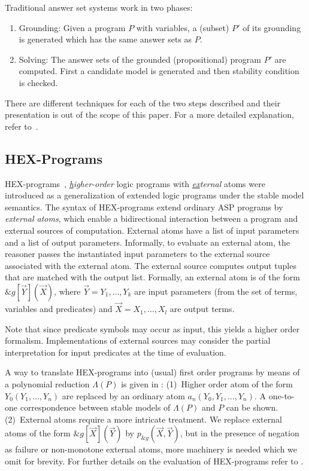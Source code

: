 Traditional answer set systems work in two phases:
\begin{enumerate}
\item Grounding: Given a program \(P\) with variables, a (subset) \(P'\) of its grounding is generated which has the same answer sets as \(P\).
\item Solving: The answer sets of the grounded (propositional) program \(P'\) are computed. First a candidate model is generated and then stability condition is checked.
\end{enumerate}


There are different techniques for each of the two steps described and their presentation is out of the scope of this paper. For a more detailed explanation, refer to~\cite{}.

\subsection{HEX-Programs}
HEX-programs~\cite{hex}, \emph{\underline{h}igher-order} logic programs with \emph{\underline{ex}ternal} atoms were introduced as a generalization of extended logic programs under the stable model semantics. The syntax of HEX-programs extend ordinary ASP programs by \emph{external atoms}, which enable a bidirectional interaction between a program and external sources of computation. External atoms have a list of input parameters and a list of output parameters. Informally, to evaluate an external atom, the reasoner passes the instantiated input parameters to the external source associated with the external atom. The external source computes output tuples that are matched with the output list. Formally, an external atom is of the form \(\&g[\vec{Y}](\vec{X})\), where \(\vec{Y} = Y_1, \dotso , Y_k\) are input parameters (from the set of terms, variables and predicates) and \(\vec{X} = X_1, \dotso , X_l \) are output terms.

Note that since predicate symbols may occur as input, this yields a higher order formalism. Implementations of external sources may consider the partial interpretation for input predicates at the time of evaluation.

A way to translate HEX-programs into (usual) first order programs by means of a polynomial reduction \(\Lambda(P)\) is given in \cite{hex}: (1)~Higher order atom of the form \(Y_0(Y_1, \dotso, Y_n)\) are replaced by an ordinary atom \(a_n(Y_0, Y_1, \dotso, Y_n)\). A one-to-one correspondence between stable models of \(\Lambda(P)\) and \(P\) can be shown. (2)~External atoms require a more intricate treatment. We replace external atoms of the form \(\&g[\vec{X}](\vec{Y})\) by \(p_{\&g}(\vec{X},\vec{Y})\), but in the presence of negation as failure or non-monotone external atoms, more machinery is needed which we omit for brevity. For further details on the evaluation of HEX-programs refer to \cite{effeval1,effeval2}.